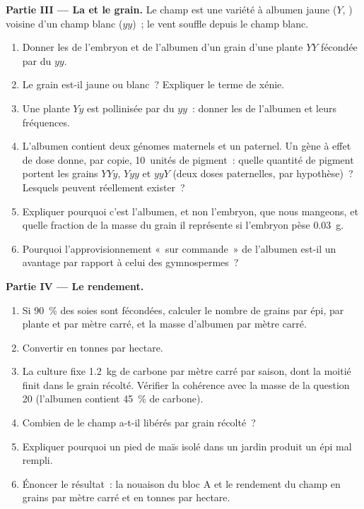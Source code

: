 \begin{problem}
\medskip
\noindent\textbf{Partie III --- La  et le grain.}
Le champ est une variété à albumen jaune ($Y$, ) voisine d'un
champ blanc ($yy$)~; le vent souffle depuis le champ blanc.
\begin{enumerate}[resume]
  \item Donner les  de l'embryon et de l'albumen d'un grain
        d'une plante $YY$ fécondée par du  $yy$.
  \item Le grain est-il jaune ou blanc~? Expliquer le terme de xénie.
  \item Une plante $Yy$ est pollinisée par du  $yy$~: donner les
         de l'albumen et leurs fréquences.
  \item L'albumen contient deux génomes maternels et un paternel. Un
        gène à effet de dose donne, par copie, 10~unités de pigment~:
        quelle quantité de pigment portent les grains $YYy$, $Yyy$ et
        $yyY$ (deux doses paternelles, par hypothèse)~? Lesquels
        peuvent réellement exister~?
  \item Expliquer pourquoi c'est l'albumen, et non l'embryon, que nous
        mangeons, et quelle fraction de la masse du grain il représente
        si l'embryon pèse \qty{0.03}{g}.
  \item Pourquoi l'approvisionnement «~sur commande~» de l'albumen
        est-il un avantage par rapport à celui des gymnospermes~?
\end{enumerate}

\medskip
\noindent\textbf{Partie IV --- Le rendement.}
\begin{enumerate}[resume]
  \item Si \qty{90}{\%} des soies sont fécondées, calculer le nombre de
        grains par épi, par plante et par mètre carré, et la masse
        d'albumen par mètre carré.
  \item Convertir en tonnes par hectare.
  \item La culture fixe \qty{1.2}{kg} de carbone par mètre carré par
        saison, dont la moitié finit dans le grain récolté. Vérifier la
        cohérence avec la masse de la question 20 (l'albumen contient
        \qty{45}{\%} de carbone).
  \item Combien de  le champ a-t-il libérés par grain
        récolté~?
  \item Expliquer pourquoi un pied de maïs isolé dans un jardin produit
        un épi mal rempli.
  \item Énoncer le résultat~: la nouaison du bloc A et le rendement du
        champ en grains par mètre carré et en tonnes par hectare.
\end{enumerate}
\end{problem}
